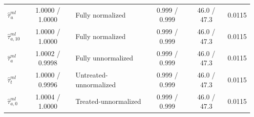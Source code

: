 \documentclass[12pt, a4paper, oneside]{article}
\theoremstyle{plain}
\theoremstyle{definition}
\begin{document}
\begin{table}[H]
\begin{threeparttable}
\begin{tabular}{@{}lclccr@{}}
\(\widehat{\tau}^{ml}_{u}\)
& 1.0000 / 1.0000
& Fully normalized
& 0.999 / 0.999
& 46.0 / 47.3
& 0.0115 \\

\(\widehat{\tau}^{ml}_{a,10}\)
& 1.0000 / 1.0000
& Fully normalized
& 0.999 / 0.999
& 46.0 / 47.3
& 0.0115 \\

\(\widehat{\tau}^{ml}_{a}\)
& 1.0002 / 0.9998
& Fully unnormalized
& 0.999 / 0.999
& 46.0 / 47.3
& 0.0115 \\

\(\widehat{\tau}^{ml}_{t}\)
& 1.0000 / 0.9996
& Untreated-unnormalized
& 0.999 / 0.999
& 46.0 / 47.3
& 0.0115 \\

\(\widehat{\tau}^{ml}_{a,0}\)
& 1.0004 / 1.0000
& Treated-unnormalized
& 0.999 / 0.999
& 46.0 / 47.3
& 0.0115 \\

\bottomrule
\end{tabular}


\end{threeparttable}
\end{table}
\end{document}
